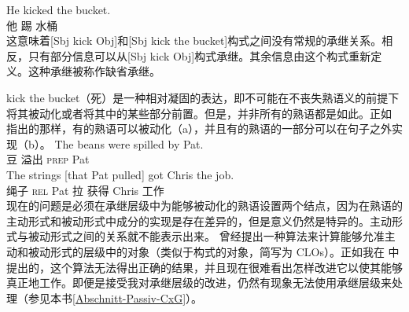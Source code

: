 \begin{exe}
\begin{xlist}[iv.]
\begin{exe}
\begin{xlist}[iv.]
\ea
\gll He kicked the bucket.\\
     他 踢  水桶\\
\z
这意味着[Sbj kick Obj]和[Sbj kick the bucket]构式之间没有常规的承继关系。相反，只有部分信息可以从[Sbj kick Obj]构式承继。其余信息由这个构式重新定义。这种承继被称作缺省承继。

kick the bucket（死）是一种相对凝固的表达，即不可能在不丧失熟语义的前提下将其被动化或者将其中的某些部分前置\citep*[]{NSW94a}。但是，并非所有的熟语都是如此。正如 \citet*[]{NSW94a}指出的那样，有的熟语可以被动化（a），并且有的熟语的一部分可以在句子之外实现（b）。
\eal
\ex 
\gll The beans were spilled by Pat.\\
      豆 \passivepst{} 溢出 \textsc{prep} Pat\\
\ex 
\gll The strings [that Pat pulled] got Chris the job.\\
      绳子 \spacebr{}\textsc{rel} Pat 拉 获得 Chris  工作\\
\zl
%
%
现在的问题是必须在承继层级中为能够被动化的熟语设置两个结点，因为在熟语的主动形式和被动形式中成分的实现是存在差异的，但是意义仍然是特异的。主动形式与被动形式之间的关系就不能表示出来。 \citet{Kay2002a}曾经提出一种算法来计算能够允准主动和被动形式的层级中的对象（类似于构式的对象，简写为 CLOs）。正如我在 \citet[\S~3]{Mueller2006d}中提出的，这个算法无法得出正确的结果，并且现在很难看出怎样改进它以使其能够真正地工作。即便是接受我对承继层级的改进，仍然有现象无法使用承继层级来处理（参见本书\ref{Abschnitt-Passiv-CxG}）。

\end{xlist}
\end{exe}
\end{xlist}
\end{exe}
